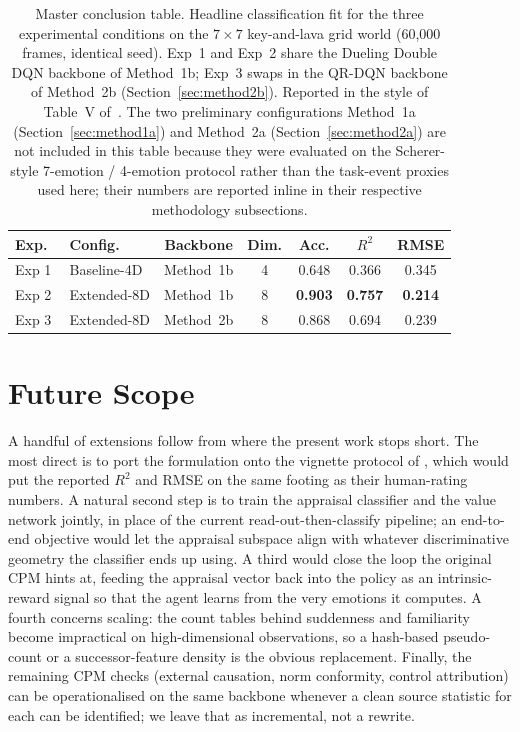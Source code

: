 \documentclass[conference]{IEEEtran}
\begin{document}
\begin{table}[!t]
\centering
\small
\setlength{\tabcolsep}{3.5pt}
\renewcommand{\arraystretch}{1.15}
\caption{Master conclusion table. Headline classification fit for the
three experimental conditions on the $7\times 7$ key-and-lava grid
world (60{,}000 frames, identical seed). Exp~1 and Exp~2 share the
Dueling Double DQN backbone of Method~1b; Exp~3 swaps in the QR-DQN
backbone of Method~2b (Section~\ref{sec:method2b}). Reported in the style
of Table~V of~\cite{zhang2023modeling}. The two preliminary
configurations Method~1a (Section~\ref{sec:method1a}) and Method~2a
(Section~\ref{sec:method2a}) are not included in this table because
they were evaluated on the Scherer-style 7-emotion / 4-emotion
protocol rather than the task-event proxies used here; their numbers
are reported inline in their respective methodology subsections.}
\label{tab:master}
\begin{tabular}{llccccc}
\toprule
Exp.\ & Config.\ & Backbone & Dim. & Acc. & $R^{2}$ & RMSE \\
\midrule
Exp 1 & Baseline-4D & Method~1b & 4 & 0.648          & 0.366          & 0.345 \\
Exp 2 & Extended-8D & Method~1b & 8 & \textbf{0.903} & \textbf{0.757} & \textbf{0.214} \\
Exp 3 & Extended-8D & Method~2b & 8 & 0.868          & 0.694          & 0.239 \\
\bottomrule
\end{tabular}
\end{table}

\section{Future Scope}
\label{sec:future}

A handful of extensions follow from where the present work stops short.
The most direct is to port the formulation onto the vignette protocol of
\cite{zhang2023modeling}, which would put the reported $R^{2}$ and RMSE
on the same footing as their human-rating numbers. A natural second step
is to train the appraisal classifier and the value network jointly, in
place of the current read-out-then-classify pipeline; an end-to-end
objective would let the appraisal subspace align with whatever
discriminative geometry the classifier ends up using. A third would
close the loop the original CPM hints at, feeding the appraisal vector
back into the policy as an intrinsic-reward signal so that the agent
learns from the very emotions it computes. A fourth concerns scaling:
the count tables behind suddenness and familiarity become impractical
on high-dimensional observations, so a hash-based pseudo-count or a
successor-feature density is the obvious replacement. Finally, the
remaining CPM checks (external causation, norm conformity, control
attribution) can be operationalised on the same backbone whenever a
clean source statistic for each can be identified; we leave that as
incremental, not a rewrite.
\end{document}
